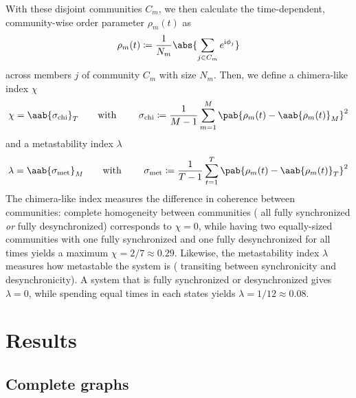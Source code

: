 \documentclass[pdflatex,lineno,referee,sn-mathphys-ay]{sn-jnl}
\begin{document}
With these disjoint communities $C_m$, we then calculate
the time-dependent, community-wise order parameter $\rho_m(t)$
as
\begin{equation}
  \rho_m(t) \coloneqq \frac{1}{N_m} \abs{\sum_{j \in C_m} e^{\im \phi_j}}
\end{equation}
across members $j$ of community $C_m$ with size $N_m$.
Then, we define a chimera-like index $\chi$
\begin{equation}
  \chi = \aab{
    \sigma_{\text{chi}}}_T
    \text{\qquad with \qquad}
    \sigma_{\text{chi}} \coloneqq \frac{1}{M-1} \sum_{m=1}^M
    \pab{\rho_m(t) - \aab{\rho_m(t)}_M}^2
  \label{eq:chimera_index}
\end{equation}
and a metastability index $\lambda$
\begin{equation}
  \lambda = \aab{
    \sigma_{\text{met}}}_M
    \text{\qquad with \qquad}
    \sigma_{\text{met}} \coloneqq \frac{1}{T-1} \sum_{t=1}^T
    \pab{\rho_m(t) - \aab{\rho_m(t)}_T}^2
  \label{eq:metastability_index}
\end{equation}
The chimera-like index measures the difference in coherence between communities:
complete homogeneity between communities
(\eg{} all fully synchronized \emph{or} fully desynchronized)
corresponds to $\chi = 0$,
while having two equally-sized communities
with one fully synchronized and one fully desynchronized
for all times yields a maximum $\chi = 2/7 \approx \num{0.29}$.
Likewise, the metastability index $\lambda$ measures how metastable
the system is (\ie{} transiting between synchronicity and desynchronicity).
A system that is fully synchronized or desynchronized gives $\lambda = 0$,
while spending equal times in each states yields $\lambda = 1/12 \approx \num{0.08}$.

\section{Results}
\label{sec:results}
\subsection{Complete graphs}
\label{sec:complete_graph}
\end{document}
